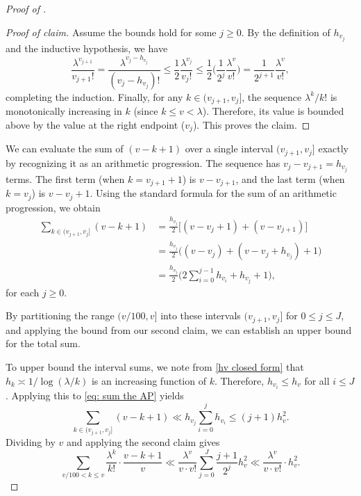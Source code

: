 \documentclass{amsart}
\theoremstyle{definition}
\numberwithin{equation}{section}
\begin{document}
\begin{proof}[Proof of ]
\begin{proof}[Proof of claim]
		Assume the bounds hold for some $j \ge 0$. By the definition of $h_{v_j}$ and the inductive hypothesis, we have
		\begin{equation} \label{pois lem v eq ind 1}
			\frac{\lambda^{v_{j+1}}}{v_{j+1}!} = \frac{\lambda^{v_j - h_{v_j}}}{(v_j - h_{v_j})!} \leq \frac{1}{2} \frac{\lambda^{v_j}}{v_j!} \leq \frac{1}{2} \bigg( \frac{1}{2^j}\frac{\lambda^v}{v!} \bigg) = \frac{1}{2^{j+1}}\frac{\lambda^v}{v!},
		\end{equation}
		completing the induction. Finally, for any $k \in (v_{j+1}, v_j]$, the sequence $\lambda^k/k!$ is monotonically increasing in $k$ (since $k \le v < \lambda$). Therefore, its value is bounded above by the value at the right endpoint ($v_j$). This proves the claim.
	\end{proof}
	
	We can evaluate the sum of $(v-k+1)$ over a single interval $(v_{j+1},v_j]$ exactly by recognizing it as an arithmetic progression. The sequence has $v_j - v_{j+1} = h_{v_j}$ terms. The first term (when $k = v_{j+1}+1$) is $v - v_{j+1}$, and the last term (when $k = v_j$) is $v - v_j + 1$. Using the standard formula for the sum of an arithmetic progression, we obtain
	\begin{align}
		\sum_{k \in (v_{j+1},v_j]} (v-k+1) \nonumber
		&= \frac{h_{v_{j}}}{2}\bigg[ (v-v_j + 1) + (v-v_{j+1}) \bigg]\\ \nonumber
		&= \frac{h_{v_{j}}}{2}\bigg( (v-v_j) + (v-v_j + h_{v_j}) + 1 \bigg)\\ 
		&= \frac{h_{v_{j}}}{2}\bigg( 2\sum_{i = 0}^{j-1}h_{v_i} + h_{v_j} + 1 \bigg), \label{eq: sum the AP}
	\end{align} 
	for each $j \geq 0$.
	
	By partitioning the range $(v/100, v]$ into these intervals $(v_{j+1}, v_j]$ for $0 \leq j \leq J$, and applying the bound from our second claim, we can establish an upper bound for the total sum. 
	
	To upper bound the interval sums, we note from \eqref{hv closed form} that $h_k \asymp 1/\log(\lambda/k)$ is an increasing function of $k$. Therefore, $h_{v_i} \leq h_v$ for all $i \leq J$. Applying this to \eqref{eq: sum the AP} yields
	$$ \sum_{k \in (v_{j+1},v_j]} (v-k+1) \ll h_{v_j} \sum_{i=0}^j h_{v_i} \leq (j+1) h_v^2. $$
	Dividing by $v$ and applying the second claim gives
	$$ \sum_{v/100 < k \leq v} \frac{\lambda^k}{k!}\cdot \frac{v-k+1}{v} \ll \frac{\lambda^v}{v \cdot v!} \sum_{j=0}^J \frac{j+1}{2^j} h_v^2 \ll \frac{\lambda^v}{v\cdot v!} \cdot h_v^2. $$
	

\end{proof}
\end{document}
